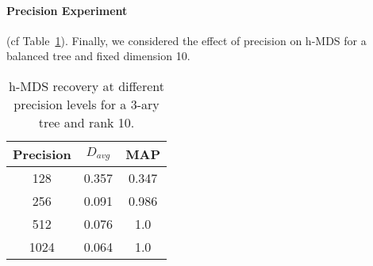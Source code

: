 \paragraph*{Precision Experiment}  (cf Table~\ref{table:mds-precision}).
Finally, we considered the effect of precision on h-MDS for a balanced tree and fixed dimension 10.
\begin{table}[ht!]
\centering
\begin{tabular}{|c||c|c|}
\hline 
  Precision   & $D_{avg}$ & MAP \\    \hline   
128 & 0.357  & 0.347 \\ \hline
256 & 0.091 &0.986 \\ \hline
512 & 0.076 & 1.0  \\  \hline
1024 &0.064 & 1.0  \\ \hline
\end{tabular}
\caption{h-MDS recovery at different precision levels for a $3$-ary tree and rank 10.}
\label{table:mds-precision}
\end{table}